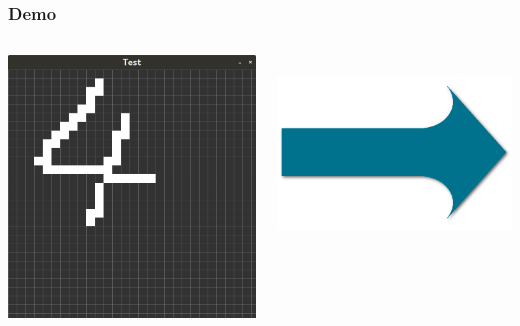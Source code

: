 \documentclass[xcolor=pdftex,dvipsnames,table]{beamer}
\begin{document}
\begin{frame}
	\frametitle{Demo}
	\begin{columns}
		\begin{column}{0.25\textwidth}
			\includegraphics[width=1\textwidth]{4_drawn.png}
		\end{column}
		\begin{column}{0.05\textwidth}
			\\
			\includegraphics[width=1\textwidth]{arrow.png}\\

\end{column}
\end{columns}
\end{frame}
\end{document}
